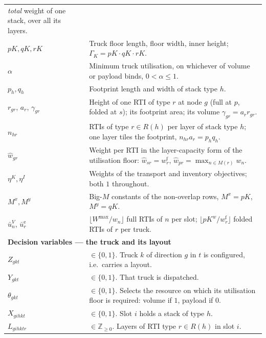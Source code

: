\begin{longtable}[hbt!]{|p{}|p{}|}
                     \emph{total} weight of one stack, over all its layers.\\
    $pK,qK,rK$     & Truck floor length, floor width, inner height;
                     $\Gamma_{K}=pK\cdot qK\cdot rK$.\\
    $\alpha$       & Minimum truck utilisation, on whichever of volume or payload
                     binds, $0<\alpha\le1$.\\
    $p_{h},q_{h}$  & Footprint length and width of stack type $h$.\\
    $r_{gr}$, $a_{r}$, $\gamma_{gr}$ & Height of one RTI of type $r$ at node $g$
                     (full at $p$, folded at $s$); its footprint area; its volume
                     $\gamma_{gr}=a_{r}r_{gr}$.\\
    $n_{hr}$       & RTIs of type $r\in R(h)$ per layer of stack type $h$; one layer
                     tiles the footprint, $n_{hr}a_{r}=p_{h}q_{h}$.\\
    $\hat w_{gr}$  & Weight per RTI in the layer-capacity form of the utilisation
                     floor: $\hat w_{sr}=w^{\mathrm{f}}_{r}$,
                     $\hat w_{pr}=\max_{n\in M(r)}w_{n}$.\\
    $\eta^{K},\eta^{I}$ & Weights of the transport and inventory objectives;
                     both $1$ throughout.\\
    $M^{x},M^{y}$  & Big-$M$ constants of the non-overlap rows, $M^{x}=pK$, $M^{y}=qK$.\\
    $\bar u^{V}_{n}$, $\bar u^{\mathrm{e}}_{r}$ & $\lfloor W^{\max}/w_{n}\rfloor$ full
                     RTIs of $n$ per slot; $\lfloor pK^{w}/w^{\mathrm{f}}_{r}\rfloor$
                     folded RTIs of $r$ per truck.\\
    \hline
    \multicolumn{2}{|l|}{\textbf{Decision variables --- the truck and its layout}}\\\hline
    $Z_{gkt}$        & $\in\{0,1\}$. Truck $k$ of direction $g$ in $t$ is configured,
                       i.e.\ carries a layout.\\
    $Y_{gkt}$        & $\in\{0,1\}$. That truck is dispatched.\\
    $\theta_{gkt}$   & $\in\{0,1\}$. Selects the resource on which its utilisation
                       floor is required: volume if $1$, payload if $0$.\\
    $X_{gihkt}$      & $\in\{0,1\}$. Slot $i$ holds a stack of type $h$.\\
    $L_{gihktr}$     & $\in\mathbb{Z}_{\ge 0}$. Layers of RTI type $r\in R(h)$ in slot $i$.\\

\end{longtable}
